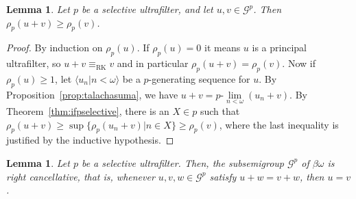 \documentclass[10pt]{amsart}
\newcommand{\ulim}[2]{#1\text{-}\lim\limits_{#2<\omega}}
\newcommand{\eqrk}[2]{#1\equiv_{\mathrm{RK}}#2}
\newtheorem{lemma}[theorem]{Lemma}
\theoremstyle{definition}
\theoremstyle{remark}
\begin{document}
\begin{lemma}\label{lem:firstinequality}
    Let $p$ be a selective ultrafilter, and let $u,v\in\mathscr G^p$. Then $\rho_p(u+v)\geq\rho_p(v)$.
\end{lemma}

\begin{proof}
    By induction on $\rho_p(u)$. If $\rho_p(u)=0$ it means $u$ is a principal ultrafilter, so $\eqrk{u+v}{v}$ and in particular $\rho_p(u+v)=\rho_p(v)$. Now if $\rho_p(u)\geq 1$, let $\langle u_n\big|n<\omega\rangle$ be a $p$-generating sequence for $u$. By Proposition~\ref{prop:talachasuma}, we have $u+v=\ulim{p}{n}(u_n+v)$. By Theorem~\ref{thm:ifpselective}, there is an $X\in p$ such that $\rho_p(u+v)\geq\sup\{\rho_p(u_n+v)\big|n\in X\}\geq\rho_p(v)$, where the last inequality is justified by the inductive hypothesis.
\end{proof}

\begin{lemma}\label{lem:cancellative}
    Let $p$ be a selective ultrafilter. Then, the subsemigroup $\mathscr G^p$ of $\beta\omega$ is right cancellative, that is, whenever $u,v,w\in\mathscr G^p$ satisfy $u+w=v+w$, then $u=v$.
\end{lemma}
\end{document}
